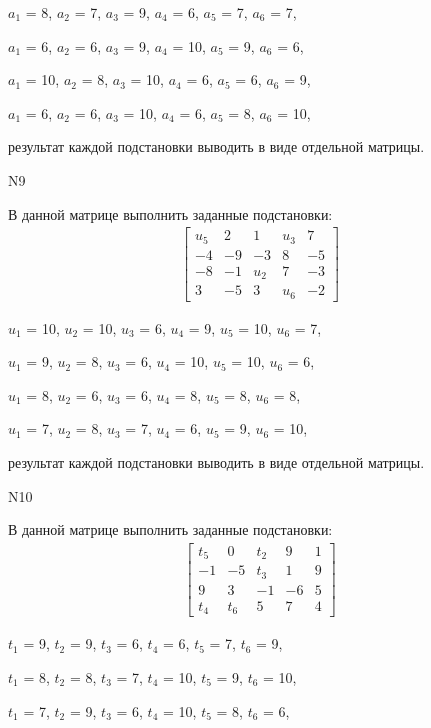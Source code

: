 \documentclass[11pt]{report}
\begin{document}
$a_{1}$ = 8, $a_{2}$ = 7, $a_{3}$ = 9, $a_{4}$ = 6, $a_{5}$ = 7, $a_{6}$ = 7, 

$a_{1}$ = 6, $a_{2}$ = 6, $a_{3}$ = 9, $a_{4}$ = 10, $a_{5}$ = 9, $a_{6}$ = 6, 

$a_{1}$ = 10, $a_{2}$ = 8, $a_{3}$ = 10, $a_{4}$ = 6, $a_{5}$ = 6, $a_{6}$ = 9, 

$a_{1}$ = 6, $a_{2}$ = 6, $a_{3}$ = 10, $a_{4}$ = 6, $a_{5}$ = 8, $a_{6}$ = 10, 

результат каждой подстановки выводить в виде отдельной матрицы.

N9

В данной матрице выполнить заданные подстановки:
\begin{align*}
\left[\begin{matrix}u_{5} & 2 & 1 & u_{3} & 7\\-4 & -9 & -3 & 8 & -5\\-8 & -1 & u_{2} & 7 & -3\\3 & -5 & 3 & u_{6} & -2\end{matrix}\right]
\end{align*}


$u_{1}$ = 10, $u_{2}$ = 10, $u_{3}$ = 6, $u_{4}$ = 9, $u_{5}$ = 10, $u_{6}$ = 7, 

$u_{1}$ = 9, $u_{2}$ = 8, $u_{3}$ = 6, $u_{4}$ = 10, $u_{5}$ = 10, $u_{6}$ = 6, 

$u_{1}$ = 8, $u_{2}$ = 6, $u_{3}$ = 6, $u_{4}$ = 8, $u_{5}$ = 8, $u_{6}$ = 8, 

$u_{1}$ = 7, $u_{2}$ = 8, $u_{3}$ = 7, $u_{4}$ = 6, $u_{5}$ = 9, $u_{6}$ = 10, 

результат каждой подстановки выводить в виде отдельной матрицы.

N10

В данной матрице выполнить заданные подстановки:
\begin{align*}
\left[\begin{matrix}t_{5} & 0 & t_{2} & 9 & 1\\-1 & -5 & t_{3} & 1 & 9\\9 & 3 & -1 & -6 & 5\\t_{4} & t_{6} & 5 & 7 & 4\end{matrix}\right]
\end{align*}


$t_{1}$ = 9, $t_{2}$ = 9, $t_{3}$ = 6, $t_{4}$ = 6, $t_{5}$ = 7, $t_{6}$ = 9, 

$t_{1}$ = 8, $t_{2}$ = 8, $t_{3}$ = 7, $t_{4}$ = 10, $t_{5}$ = 9, $t_{6}$ = 10, 

$t_{1}$ = 7, $t_{2}$ = 9, $t_{3}$ = 6, $t_{4}$ = 10, $t_{5}$ = 8, $t_{6}$ = 6, 
\end{document}
